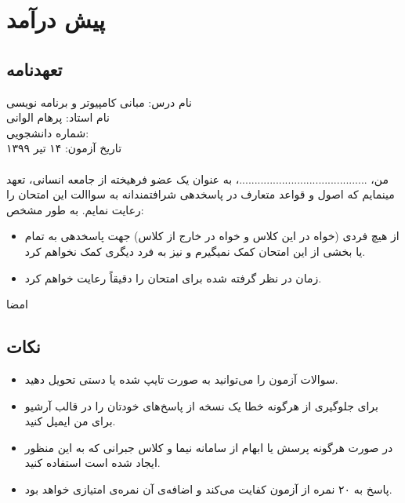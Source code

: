 \documentclass[../main.tex]{subfiles}
\begin{document}
\section{پیش درآمد}
\subsection{تعهدنامه}
نام درس:‌ مبانی کامپیوتر و برنامه نویسی\\
نام استاد:‌ پرهام الوانی\\
شماره دانشجویی:‌ \hspace{2em}\\
تاریخ آزمون:‌ ۱۴ تیر ۱۳۹۹

\paragraph{}
من، ..........................................، به عنوان یک عضو فرهیخته از جامعه انسانی، تعهد مینمایم که اصول و قواعد متعارف در پاسخدهی
شرافتمندانه به سواالت این امتحان را رعایت نمایم. به طور مشخص:

\begin{itemize}
    \item  از هیچ فردی (خواه در این کلاس و خواه در خارج از کلاس) جهت پاسخدهی به تمام یا بخشی از این امتحان کمک نمیگیرم
    و نیز به فرد دیگری کمک نخواهم کرد.
    \item زمان در نظر گرفته شده برای امتحان را دقیقاً رعایت خواهم کرد.
\end{itemize}

امضا

\subsection{نکات}
\begin{itemize}
    \item سوالات آزمون را می‌توانید به صورت تایپ شده یا دستی تحویل دهید.
    \item برای جلوگیری از هرگونه خطا یک نسخه از پاسخ‌های خودتان را در قالب آرشیو برای من ایمیل کنید.
    \item در صورت هرگونه پرسش یا ابهام از سامانه نیما و کلاس جبرانی که به این منظور ایجاد شده است استفاده کنید.
    \item پاسخ به ۲۰ نمره از آزمون کفایت می‌کند و اضافه‌ی آن نمره‌ی امتیازی خواهد بود.
\end{itemize}
\end{document}
